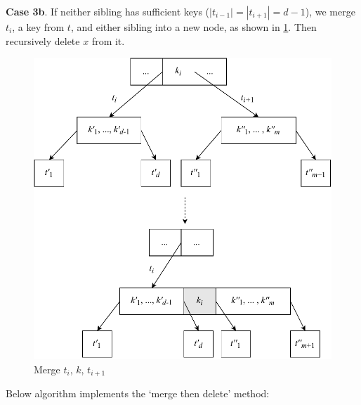 \documentclass[b5paper]{article}
\begin{document}
\textbf{Case 3b}. If neither sibling has sufficient keys ($|t_{i-1}| = |t_{i+1}| = d - 1$), we merge $t_i$, a key from $t$, and either sibling into a new node, as shown in \cref{fig:btree-del-merge-subtree}. Then recursively delete $x$ from it.

\begin{figure}[htbp]
  \centering
  \includegraphics[scale=0.65]{img/btree-del-merge-subtree}
  \caption{Merge $t_i$, $k$, $t_{i+1}$}
  \label{fig:btree-del-merge-subtree}
\end{figure}

Below  algorithm implements the `merge then delete' method:
\end{document}

